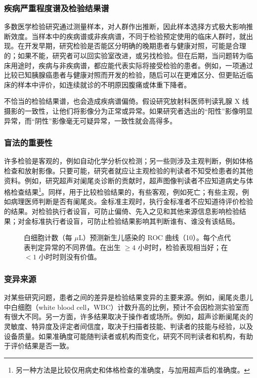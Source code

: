 \subsubsection{疾病严重程度谱及检验结果谱}
多数医学检验研究通过测量样本，对人群作出推断，因此样本选择方式极大影响推断效度。当样本中的疾病谱或非疾病谱，不同于检验预定使用的临床人群时，就出现。在开发早期，研究检验是否能区分明确的晚期患者与健康对照，可能是合理的；如果不能，研究者可以回实验室改进，或另找检验。但在后期，当问题转为临床用途时，疾病与非疾病谱，都应能代表实际将接受检验的患者。例如，一项通过比较已知胰腺癌患者与健康对照而开发的检验，随后可以在更难区分、但更贴近临床的样本中评价，如连续就诊的不明原因腹痛或体重下降者。

不恰当的检验结果谱，也会造成疾病谱偏倚。假设研究放射科医师判读乳腺 X 线摄影的一致性，让他们将影像分为正常或异常。如果研究者选出的“阳性”影像明显异常，而“阴性”影像毫无可疑异常，一致性就会高得多。

\subsubsection{盲法的重要性}
许多检验是客观的，例如自动化学分析仪检测；另一些则涉及主观判断，例如体格检查和放射影像。只要可能，研究者就应让主观检验的判读者不知受检患者的其他资料。例如，研究超声对阑尾炎诊断的贡献时，超声图像判读者不应知道病史与体格检查结果\footnote{另一种方法是比较仅用病史和体格检查的准确度，与加用超声后的准确度。}。同样，用于比较检验结果的，有些客观，例如死亡；有些主观，例如病理医师判断是否有阑尾炎。金标准主观时，执行金标准者不应知道待评价检验的结果。对检验执行者设盲，可防止偏倚、先入之见和其他来源信息影响检验结果；对金标准执行者设盲，可防止检验结果影响其判断谁有、谁没有该结局。

\par
\begin{figure}[htbp]\centering\chthirteenroc
\caption{白细胞计数（每 $\mu$L）预测新生儿感染的 ROC 曲线（10）。每个点代表判定异常的不同界值。在出生 $\geq4$ 小时时，检验表现相当好；在 $<1$ 小时时则没有价值。}\label{fig:13_01}\end{figure}\par

\subsubsection{变异来源}
对某些研究问题，患者之间的差异是检验结果变异的主要来源。例如，阑尾炎患儿中白细胞（white blood cell，WBC）计数升高的比例，预计不会因检测实验室而有很大不同。另一方面，许多结果取决于操作者或场所。例如，超声诊断阑尾炎的灵敏度、特异度及评定者间信度，取决于扫描者技能、判读者的技能与经验，以及设备质量。如果准确度可能随判读者或机构而变化，研究不同判读者和机构，有助于评价结果是否一致。

